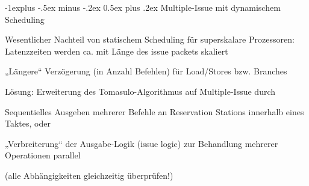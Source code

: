 \documentclass[10pt,landscape]{article}
\makeatletter
\renewcommand{\subsection}{\@startsection{subsection}{2}{0mm}%
                                {-1explus -.5ex minus -.2ex}%
                                {0.5ex plus .2ex}%
                                {\normalfont\normalsize\bfseries}}
\makeatother
\begin{document}
\begin{multicols}{3}
  
  \subsection{ Multiple-Issue mit dynamischem Scheduling}
  \begin{itemize*}
    \item Wesentlicher Nachteil von statischem Scheduling für superskalare Prozessoren: Latenzzeiten werden ca. mit Länge des issue packets skaliert
    \item „Längere“ Verzögerung (in Anzahl Befehlen) für Load/Stores bzw. Branches
    \item Lösung: Erweiterung des Tomasulo-Algorithmus auf Multiple-Issue durch
    \item Sequentielles Ausgeben mehrerer Befehle an Reservation Stations innerhalb eines Taktes, oder
    \item „Verbreiterung“ der Ausgabe-Logik (issue logic) zur Behandlung mehrerer Operationen parallel
    \item (alle Abhängigkeiten gleichzeitig überprüfen!)
  \end{itemize*}
  

\end{multicols}
\end{document}
